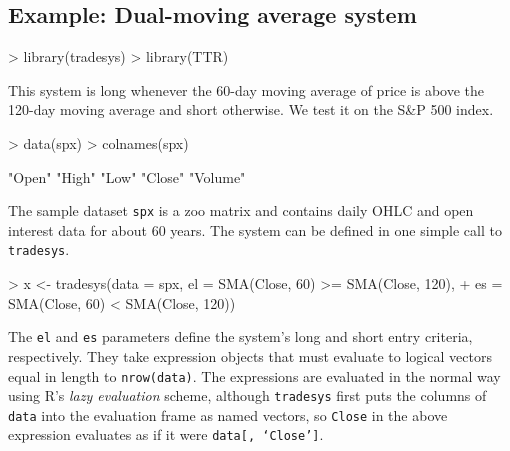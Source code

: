 \documentclass[a4]{article}
\newcommand{\code}[1]{\texttt{#1}}
\begin{document}
\subsection{Example: Dual-moving average system}
\begin{Schunk}
\begin{Sinput}
> library(tradesys)
> library(TTR)
\end{Sinput}
\end{Schunk}
This system is long whenever the 60-day moving average of price is
above the 120-day moving average and short otherwise. We test it on
the S\&P 500 index.
\begin{Schunk}
\begin{Sinput}
> data(spx)
> colnames(spx)
\end{Sinput}
\begin{Soutput}
[1] "Open"   "High"   "Low"    "Close"  "Volume"
\end{Soutput}
\end{Schunk}
The sample dataset \code{spx} is a zoo matrix and contains daily
OHLC and open interest data for about 60 years. The system can be
defined in one simple call to \code{tradesys}.
\begin{Schunk}
\begin{Sinput}
> x <- tradesys(data = spx, el = SMA(Close, 60) >= SMA(Close, 120), 
+     es = SMA(Close, 60) < SMA(Close, 120))
\end{Sinput}
\end{Schunk}
The \code{el} and \code{es} parameters define the system's long and
short entry criteria, respectively. They take expression objects that
must evaluate to logical vectors equal in length to \code{nrow(data)}.
The expressions are evaluated in the normal way using R's \emph{lazy
  evaluation} scheme, although \code{tradesys} first puts the columns
of \code{data} into the evaluation frame as named vectors, so
\code{Close} in the above expression evaluates as if it were
\code{data[, `Close']}.
\end{document}
